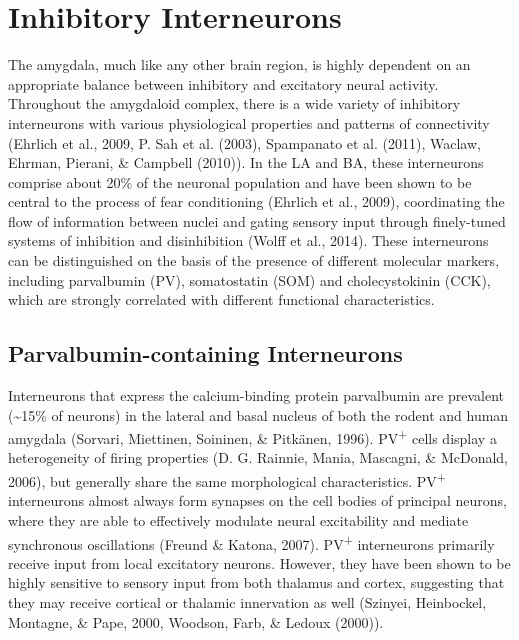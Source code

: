 \documentclass[12pt,a4paperpaper,]{report}
\begin{document}
\section{Inhibitory Interneurons}\label{inhibitory-interneurons}

The amygdala, much like any other brain region, is highly dependent on
an appropriate balance between inhibitory and excitatory neural
activity. Throughout the amygdaloid complex, there is a wide variety of
inhibitory interneurons with various physiological properties and
patterns of connectivity (Ehrlich et al., 2009, P. Sah et al. (2003),
Spampanato et al. (2011), Waclaw, Ehrman, Pierani, \& Campbell (2010)).
In the LA and BA, these interneurons comprise about 20\% of the neuronal
population and have been shown to be central to the process of fear
conditioning (Ehrlich et al., 2009), coordinating the flow of
information between nuclei and gating sensory input through finely-tuned
systems of inhibition and disinhibition (Wolff et al., 2014). These
interneurons can be distinguished on the basis of the presence of
different molecular markers, including parvalbumin (PV), somatostatin
(SOM) and cholecystokinin (CCK), which are strongly correlated with
different functional characteristics.

\subsection{Parvalbumin-containing
Interneurons}\label{parvalbumin-containing-interneurons}

Interneurons that express the calcium-binding protein parvalbumin are
prevalent (\textasciitilde{}15\% of neurons) in the lateral and basal
nucleus of both the rodent and human amygdala (Sorvari, Miettinen,
Soininen, \& Pitkänen, 1996). PV\textsuperscript{+} cells display a
heterogeneity of firing properties (D. G. Rainnie, Mania, Mascagni, \&
McDonald, 2006), but generally share the same morphological
characteristics. PV\textsuperscript{+} interneurons almost always form
synapses on the cell bodies of principal neurons, where they are able to
effectively modulate neural excitability and mediate synchronous
oscillations (Freund \& Katona, 2007). PV\textsuperscript{+}
interneurons primarily receive input from local excitatory neurons.
However, they have been shown to be highly sensitive to sensory input
from both thalamus and cortex, suggesting that they may receive cortical
or thalamic innervation as well (Szinyei, Heinbockel, Montagne, \& Pape,
2000, Woodson, Farb, \& Ledoux (2000)).
\end{document}
